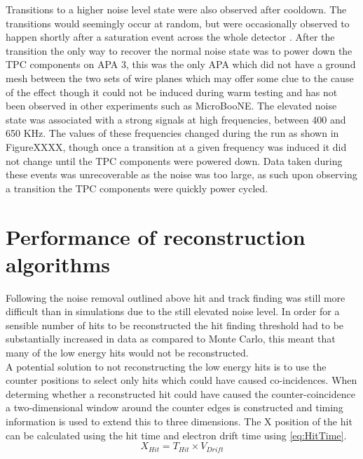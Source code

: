 Transitions to a higher noise level state were also observed after cooldown. The transitions would seemingly occur at random, but were occasionally observed to happen shortly after a saturation event across the whole detector \citep{35tonNoiseMeeting}. After the transition the only way to recover the normal noise state was to power down the TPC components on APA 3, this was the only APA which did not have a ground mesh between the two sets of wire planes which may offer some clue to the cause of the effect though it could not be induced during warm testing and has not been observed in other experiments such as MicroBooNE. The elevated noise state was associated with a strong signals at high frequencies, between 400 and 650 KHz. The values of these frequencies changed during the run as shown in FigureXXXX, though once a transition at a given frequency was induced it did not change until the TPC components were powered down. Data taken during these events was unrecoverable as the noise was too large, as such upon observing a transition the TPC components were quickly power cycled. 

\section{Performance of reconstruction algorithms}  %
Following the noise removal outlined above hit and track finding was still more difficult than in simulations due to the still elevated noise level. In order for a sensible number of hits to be reconstructed the hit finding threshold had to be substantially increased in data as compared to Monte Carlo, this meant that many of the low energy hits would not be reconstructed. \\

A potential solution to not reconstructing the low energy hits is to use the counter positions to select only hits which could have caused co-incidences. When determing whether a reconstructed hit could have caused the counter-coincidence a two-dimensional window around the counter edges is constructed and timing information is used to extend this to three dimensions.  The X position of the hit can be calculated using the hit time and electron drift time using \ref{eq:HitTime}. \\
\begin{equation} \label{eq:HitTime}
  X_{Hit} = T_{Hit} \times V_{Drift}
\end{equation}

